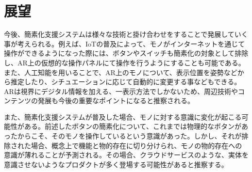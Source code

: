 
\chapter{展望}
\label{chap:outlook}

今後、簡素化支援システムは様々な技術と掛け合わせをすることで発展していく事が考えられる。例えば、IoTの普及によって、モノがインターネットを通じて操作ができるようになった際には、ボタンやスイッチも簡素化の対象として排除し、AR上の仮想的な操作パネルにて操作を行うようにすることも可能である。また、人工知能を用いることで、AR上のモノについて、表示位置を姿勢などから推定したり、シチュエーションに応じて自動的に変更する事などもできる。ARは視界にデジタル情報を加える、一表示方法でしかないため、周辺技術やコンテンツの発展も今後の重要なポイントになると推察される。

また、簡素化支援システムが普及した場合、モノに対する意識に変化が起こる可能性がある。前述したボタンの簡素化について、これまでは物理的なボタンがあったからこそ、そのモノを操作しているという意識があった。しかし、それが排除された場合、概念上で機能と物的存在に切り分けられ、モノの物的存在への意識が薄れることが予測される。その場合、クラウドサービスのような、実体を意識させないようなプロダクトが多く登場する可能性があると推察する。